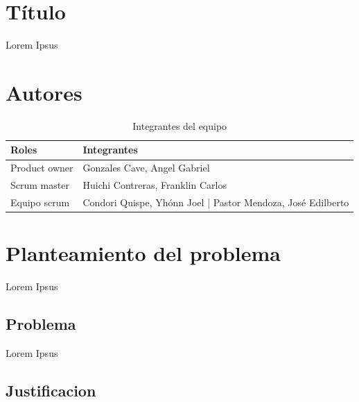 \documentclass[preprint,12pt]{elsarticle}
\begin{document}
\section{Título}

Lorem Ipsus


\section{Autores}

\begin{table}[htbp]
\begin{center}
\begin{tabular}{|l|l|}
\hline
Roles & Integrantes \\
\hline \hline
Product owner & Gonzales Cave, Angel Gabriel \\ \hline
Scrum master & Huichi Contreras, Franklin Carlos  \\ \hline
Equipo scrum & Condori Quispe, Yhónn Joel | Pastor Mendoza, José Edilberto \\ \hline
\end{tabular}
\caption{Integrantes del equipo}
\label{tabla:sencilla}
\end{center}
\end{table}




\section{Planteamiento del problema}
Lorem Ipsus


\subsection {\textbf{Problema}}
Lorem Ipsus


\subsection {\textbf{Justificacion}}
\end{document}

